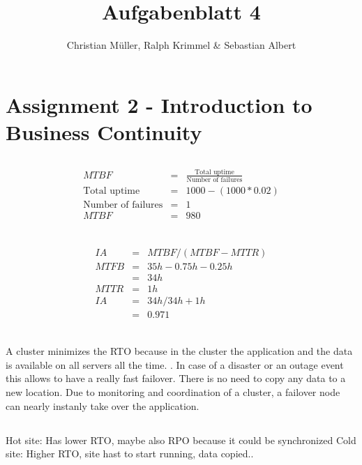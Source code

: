 \documentclass{article}
\title{Aufgabenblatt 4}
\author{Christian Müller, Ralph Krimmel \& Sebastian Albert }
\begin{document}
\maketitle

\section*{Assignment 2 - Introduction to Business Continuity}

\subsection{}
\begin{eqnarray*} 
	MTBF &=& \frac{\text{Total uptime}}{\text{Number of failures}}  \\
	\text{Total uptime} &=& 1000 - (1000*0.02) \\
	\text{Number of failures} &=& 1 \\
	MTBF &=& 980 \\ 
\end{eqnarray*}

\subsection{}
\begin{eqnarray*}
	IA &=& MTBF/(MTBF-MTTR)\\
	MTFB &=& 35h-0.75h-0.25h \\
	&=& 34h \\
	MTTR &=& 1h \\
	IA &=& 34h/34h+1h \\
	&=& 0.971  \\
\end{eqnarray*}

\subsection{}
A cluster minimizes the RTO because in the cluster the application  and  the data is available on all servers all the time. . In case of a disaster or an outage event this allows to have a really fast failover. There is no need to copy any data to a new location. Due to monitoring and coordination of a cluster, a failover node can nearly instanly take over the application. 

\subsection{}
Hot site: Has lower RTO, maybe also RPO because it could be synchronized 
Cold site: Higher RTO, site hast to start running, data copied.. 
\end{document}
